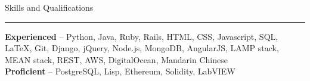 \documentclass[11pt,letterpaper]{article}
\makeatletter
\newenvironment{topic}[1]
    {
    {\Large \centerline{#1}}
    \vspace*{0.03in}
    \hrule 
    \vspace*{0.05in}
    }
    {}
\newenvironment{event}
    {
    \begin{tabular*}{\textwidth}{l@{\extracolsep{\fill}}r}
    }
    {
    \end{tabular*}
    }
\newenvironment{detail}
    {
    \normalsize
    }
    {
    \vspace*{0.02in}
    }
\makeatother
\begin{document}





    \begin{topic}{Skills and Qualifications}
        \begin{detail}
            \textbf{Experienced} -- Python, Java, Ruby, Rails, HTML, CSS, Javascript, SQL, LaTeX, Git, Django, jQuery, Node.js, MongoDB, AngularJS, LAMP stack, MEAN stack, REST, AWS, DigitalOcean, Mandarin Chinese\\
            \textbf{Proficient} -- PostgreSQL, Lisp, Ethereum, Solidity, LabVIEW
        \end{detail}
    \end{topic}
\end{document}
